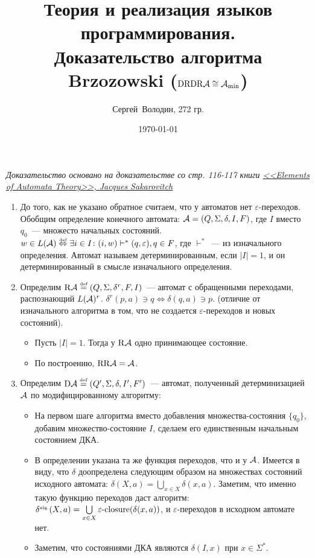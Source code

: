 \documentclass[a4paper]{article}
\title{Теория и реализация языков программирования.\\Доказательство алгоритма Brzozowski ($\mathrm{DRDR}\A\cong\A_{\min}$)}
\date{\today}
\author{Сергей~Володин, 272 гр.}
\def\A{{\cal A}}
\def\eqdef{\overset{\mbox{\tiny def}}{=}}
\def\D{{\mathrm{D}}}
\def\R{{\mathrm{R}}}
\begin{document}
\maketitle
{\em{Доказательство основано на доказательстве со стр. 116-117 книги \href{http://lib.mipt.ru/book/283234/}{<<Elements of Automata Theory>>, Jacques Sakarovitch}}}
\begin{enumerate}
\item До того, как не указано обратное считаем, что у автоматов нет $\varepsilon$-переходов.\newline
Обобщим определение конечного автомата: $\A=(Q,\Sigma,\delta,I,F)$, где $I$ вместо $q_0$~--- множесто начальных состояний.\newline
$w\in L(\A)\overset{\mbox{\tiny def}}{\Leftrightarrow} \exists i\in I\colon (i,w)\vdash^*(q,\varepsilon), q\in F$, где $\vdash^*$~--- из изначального определения. Автомат называем детерминированным, если $|I|=1$, и он детерминированный в смысле изначального определения.
\item Определим $\R\A\eqdef(Q,\Sigma,\delta^r,F,I)$~--- автомат с обращенными переходами, распознающий $L(\A)^r$. $\delta^r(p,a)\ni q\Leftrightarrow \delta(q,a)\ni p$. (отличие от изначального алгоритма в том, что не создается $\varepsilon$-переходов и новых состояний).
\begin{itemize}
\item Пусть $|I|=1$. Тогда у $\R\A$ одно принимающее состояние.
\item По построению, $\R\R\A=\A$.
\end{itemize}
\item Определим $\D\A\eqdef(Q',\Sigma,\delta,I',F')$~--- автомат, полученный детерминизацией $\A$ по модифицированному алгоритму:
\begin{itemize}
\item На первом шаге алгоритма вместо добавления множества-состояния $\{q_0\}$, добавим множество-состояние $I$, сделаем его единственным начальным состоянием ДКА.
\item В определении указана та же функция переходов, что и у $\A$. Имеется в виду, что $\delta$ доопределена следующим образом на множествах состояний исходного автомата: $\delta(X,a)=\bigcup\limits_{x\in X}\delta(x,a)$. Заметим, что именно такую функцию переходов даст алгоритм: $\delta^{\mbox{\tiny alg.}}(X,a)=\bigcup\limits_{x\in X}\varepsilon\mbox{-closure}(\delta(x,a))$, и $\varepsilon$-переходов в исходном автомате нет.
\item Заметим, что состояниями ДКА являются $\delta(I,x)$ при $x\in\Sigma^*$.

\end{itemize}
\end{enumerate}
\end{document}
